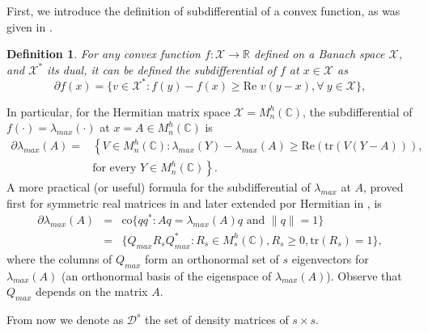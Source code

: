\documentclass[12pt,a4paper]{article}
\def\calD{\mathcal D}
\def\R{\mathbb R}
\def\C{\mathbb C}
\def\tr{\text{tr}}
\newtheorem{definition}{Definition}
\numberwithin{equation}{section}
\begin{document}
First, we introduce the definition of subdifferential of a convex function, as was given in \cite{bata-grover}. 


\begin{definition}\label{def subdiferencial}
	For any convex function $f:\mathcal{X}\to \R$ defined on a Banach space $\mathcal{X}$, and $\mathcal{X}^*$ its dual, it can be defined the subdifferential of $f$ at $x\in\mathcal{X}$ as
	\begin{equation}\label{subdif gral banach}
		\partial f(x)=\{v\in\mathcal{X}^*: f(y)-f(x)\geq \text{Re } v(y-x), \forall\ y\in \mathcal{X}\}, 
	\end{equation}
\end{definition}
In particular, for the Hermitian matrix space $\mathcal{X}=M_n^{h}(\C)$, the subdifferential of $f(\cdot)=\lambda_{max}(\cdot)$ at $x=A\in M_n^h(\C)$ is
\begin{align*}
	\partial \lambda_{max}(A)=& \left\lbrace V\in M_n^{h}(\C): \lambda_{max}(Y)-\lambda_{max}(A)\geq \text{Re}\left(  \tr(V(Y-A))\right),\right. \\ 
	&\left. \text{for every } Y\in M_n^{h}(\C) \right\rbrace .
\end{align*}
A more practical (or useful) formula for the subdifferential of $\lambda_{max}$ at $A$, proved first for symmetric real matrices in \cite{overton2} and later extended por Hermitian in \cite{BV-SDP}, is
\begin{eqnarray} \label{subdif matrices}
	\partial\lambda_{max}(A)&=&\text{co}\{qq^*: Aq=\lambda_{max}(A)q \text{ and }\|q\|=1\}\\ \nonumber
	&=&\{Q_{max}R_sQ_{max}^*: R_s\in M_s^{h}(\C), R_s\geq 0, \tr(R_s)=1\},
\end{eqnarray}
where the columns of $Q_{max}$ form an orthonormal set of $s$ eigenvectors for $\lambda_{max}(A)$ (an orthonormal basis of the eigenspace of $\lambda_{max}(A)$). Observe that $Q_{max}$ depends on the matrix $A$. 

From now we denote as $\calD^s$ the set of density matrices of $s\times s$.
\end{document}
